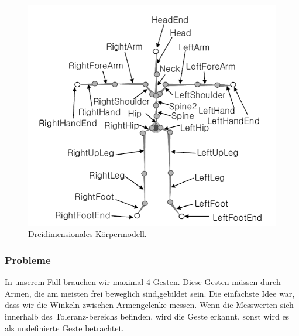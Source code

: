 \begin{figure}[h]
\label{fig:gesten_skelett}
\centering
\includegraphics[scale=0.7]{graphics/BILD-Skelett.png}
\caption{Dreidimensionales Körpermodell\cite{Hwang2006}.}
\end{figure}

\subsubsection{Probleme}
\authorsection{\editorhamza}
In unserem Fall brauchen wir maximal 4 Gesten. Diese Gesten müssen durch Armen, die am meisten frei beweglich sind,gebildet sein.  Die einfachste Idee war, dass wir die Winkeln  zwischen Armengelenke messen. Wenn die Messwerten sich  innerhalb des Toleranz-bereichs befinden, wird die Geste erkannt, sonst  wird es als undefinierte Geste betrachtet. 

